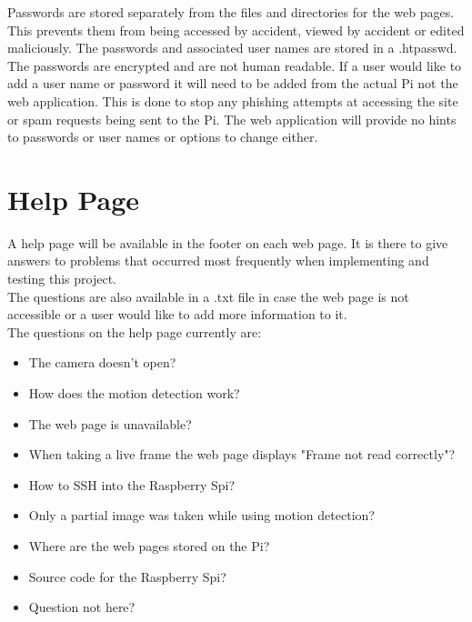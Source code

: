 \documentclass[12pt]{report}
\begin{document}
Passwords are stored separately from the files and directories for the web pages. This prevents them from being accessed by accident, viewed by accident or edited maliciously. The passwords and associated user names are stored in a .htpasswd. The passwords are encrypted and are not human readable. If a user would like to add a user name or password it will need to be added from the actual Pi not the web application. This is done to stop any phishing attempts at accessing the site or spam requests being sent to the Pi. The web application will provide no hints to passwords or user names or options to change either.\\

\section{Help Page}
\label{sec:help}

A help page will be available in the footer on each web page. It is there to give answers to problems that occurred most frequently when implementing and testing this project.\\

The questions are also available in a .txt file in case the web page is not accessible or a user would like to add more information to it.\\

{The questions on the help page currently are:\\}

\begin{itemize}
  \item The camera doesn't open?\\
  \item How does the motion detection work? \\
  \item The web page is unavailable?\\
  \item When taking a live frame the web page displays "Frame not read correctly"?\\
  \item How to SSH into the Raspberry Spi?\\
  \item Only a partial image was taken while using motion detection?\\
  \item Where are the web pages stored on the Pi?\\
  \item Source code for the Raspberry Spi?\\
  \item Question not here?\\
\end{itemize}
\end{document}

